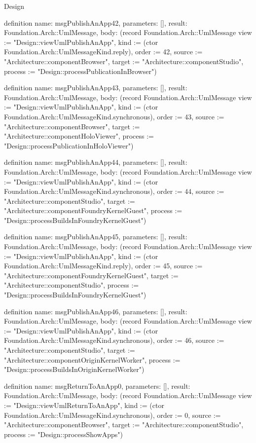 \begin{lexlean}{Design}
\begin{semanticmodule}
definition{
  name: msgPublishAnApp42,
  parameters: [],
  result: Foundation.Arch::UmlMessage,
  body: (record Foundation.Arch::UmlMessage {view := "Design::viewUmlPublishAnApp", kind := (ctor Foundation.Arch::UmlMessageKind.reply), order := 42, source := "Architecture::componentBrowser", target := "Architecture::componentStudio", process := "Design::processPublicationInBrowser"})
}

definition{
  name: msgPublishAnApp43,
  parameters: [],
  result: Foundation.Arch::UmlMessage,
  body: (record Foundation.Arch::UmlMessage {view := "Design::viewUmlPublishAnApp", kind := (ctor Foundation.Arch::UmlMessageKind.synchronous), order := 43, source := "Architecture::componentBrowser", target := "Architecture::componentHoloViewer", process := "Design::processPublicationInHoloViewer"})
}

definition{
  name: msgPublishAnApp44,
  parameters: [],
  result: Foundation.Arch::UmlMessage,
  body: (record Foundation.Arch::UmlMessage {view := "Design::viewUmlPublishAnApp", kind := (ctor Foundation.Arch::UmlMessageKind.synchronous), order := 44, source := "Architecture::componentStudio", target := "Architecture::componentFoundryKernelGuest", process := "Design::processBuildsInFoundryKernelGuest"})
}

definition{
  name: msgPublishAnApp45,
  parameters: [],
  result: Foundation.Arch::UmlMessage,
  body: (record Foundation.Arch::UmlMessage {view := "Design::viewUmlPublishAnApp", kind := (ctor Foundation.Arch::UmlMessageKind.reply), order := 45, source := "Architecture::componentFoundryKernelGuest", target := "Architecture::componentStudio", process := "Design::processBuildsInFoundryKernelGuest"})
}

definition{
  name: msgPublishAnApp46,
  parameters: [],
  result: Foundation.Arch::UmlMessage,
  body: (record Foundation.Arch::UmlMessage {view := "Design::viewUmlPublishAnApp", kind := (ctor Foundation.Arch::UmlMessageKind.synchronous), order := 46, source := "Architecture::componentStudio", target := "Architecture::componentOriginKernelWorker", process := "Design::processBuildsInOriginKernelWorker"})
}

definition{
  name: msgReturnToAnApp0,
  parameters: [],
  result: Foundation.Arch::UmlMessage,
  body: (record Foundation.Arch::UmlMessage {view := "Design::viewUmlReturnToAnApp", kind := (ctor Foundation.Arch::UmlMessageKind.synchronous), order := 0, source := "Architecture::componentBrowser", target := "Architecture::componentStudio", process := "Design::processShowApps"})
}


\end{semanticmodule}
\end{lexlean}
